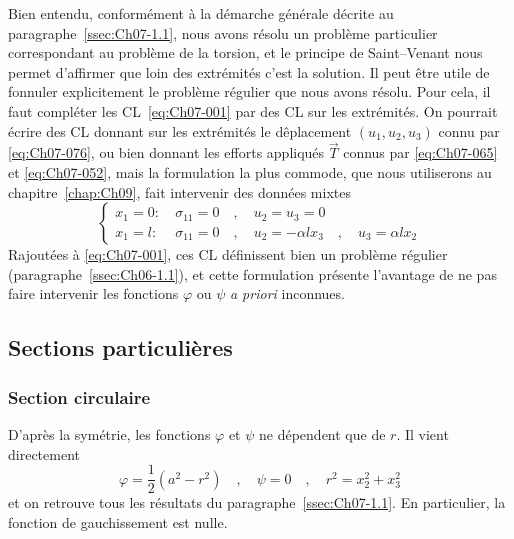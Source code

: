 Bien entendu, conformément à la démarche générale décrite au paragraphe~\ref{ssec:Ch07-1.1}, nous avons résolu un problème particulier correspondant au problème de la torsion, et le principe de Saint--Venant nous permet d'affirmer que loin des extrémités c'est la solution.
Il peut être utile de fonnuler explicitement le problème régulier que nous avons résolu.
Pour cela, il faut compléter les CL~\eqref{eq:Ch07-001} par des CL sur les extrémités.
On pourrait écrire des CL donnant sur les extrémités le dêplacement $(u_1, u_2, u_3)$ connu par \eqref{eq:Ch07-076}, ou bien donnant les efforts appliqués $\vec{T}$ connus par \eqref{eq:Ch07-065} et \eqref{eq:Ch07-052}, mais la formulation la plus commode, que nous utiliserons au chapitre~\ref{chap:Ch09}, fait intervenir des données mixtes
\begin{equation}
    \left\{
    \begin{aligned}
        x_1 = 0 : &\ \sigma_{11} = 0 \quad , \quad u_2 = u_3 = 0 \\
        x_1 = l : &\ \sigma_{11} = 0 \quad , \quad u_2 = -\alpha l x_3 \quad,\quad u_3 = \alpha l x_2
    \end{aligned}
    \right.
    \label{eq:Ch07-079} 
\end{equation}
Rajoutées à \eqref{eq:Ch07-001}, ces CL définissent bien un problème régulier (paragraphe~\ref{ssec:Ch06-1.1}), et cette formulation présente l'avantage de ne pas faire intervenir les fonctions $\varphi$ ou $\psi$ \textit{a priori} inconnues. 

\subsection{Sections particulières} \label{ssec:Ch07-2.4}
\subsubsection{Section circulaire}
D'après la symétrie, les fonctions $\varphi$ et $\psi$ ne dépendent que de $r$.
Il vient directement 
\begin{equation}
    \varphi =\frac{1}{2}\left( a^2 - r^2 \right) \quad , \quad \psi = 0 \quad , \quad r^2 = x_2^2 + x_3^2 
    \label{eq:Ch07-080}
\end{equation}
et on retrouve tous les résultats du paragraphe~\ref{ssec:Ch07-1.1}.
En particulier, la fonction de gauchissement est nulle.
